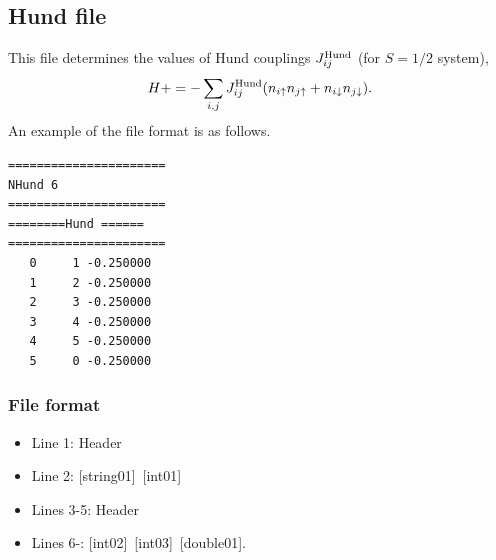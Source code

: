\subsection{Hund file}
This file determines the values of Hund couplings $J_{ij}^{\rm Hund}$ {(for $S=1/2$ system)},
\begin{equation}
H+=-\sum_{i,j}J_{ij}^{\rm Hund} (n_{i\uparrow}n_{j\uparrow}+n_{i\downarrow}n_{j\downarrow}).
\end{equation}
An example of the file format is as follows.

\begin{minipage}{12.5cm}
\begin{screen}
\begin{verbatim}
====================== 
NHund 6  
====================== 
========Hund ====== 
====================== 
   0     1 -0.250000
   1     2 -0.250000
   2     3 -0.250000
   3     4 -0.250000
   4     5 -0.250000
   5     0 -0.250000
\end{verbatim}
\end{screen}
\end{minipage}

\subsubsection{File format}
 \begin{itemize}
   \item  Line 1:  Header
   \item  Line 2:   [string01]~[int01]
   \item  Lines 3-5:  Header
   \item  Lines 6-: 
   [int02]~[int03]~[double01]. 
  \end{itemize}
